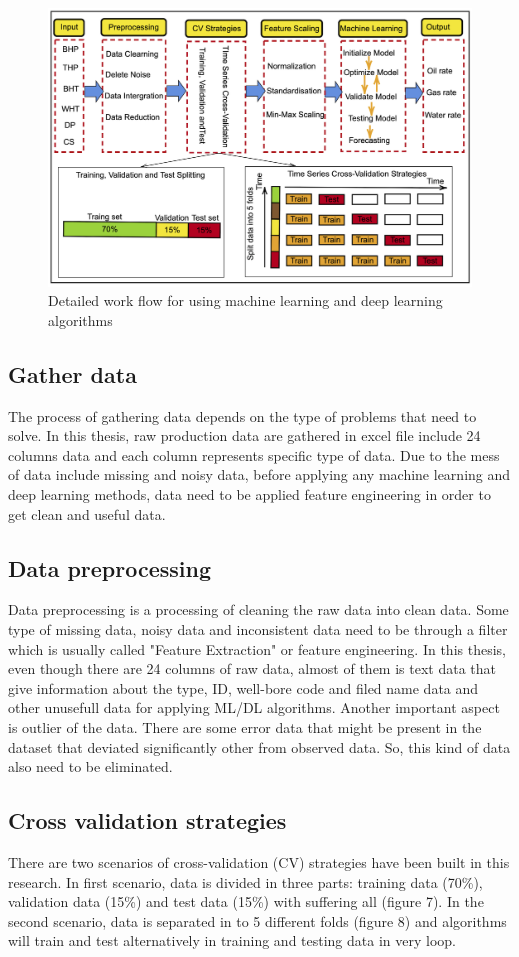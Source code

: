 \documentclass[12pt,a4paper]{report}
\begin{document}
\begin{figure}[H]
\centering
\includegraphics[scale=0.55]{Fig/4.png}
\caption{Detailed work flow for using machine learning and deep learning algorithms}
\end{figure}
\subsection{Gather data}
The process of gathering data depends on the type of problems that need to solve. In this thesis, raw production data are gathered in excel file include 24 columns data and each column represents specific type of data. Due to the mess of data include missing and noisy data, before applying any machine learning and deep learning methods, data need to be applied feature engineering in order to get clean and useful data.

\subsection{Data preprocessing}
Data preprocessing is a processing of cleaning the raw data into clean data. Some type of missing data, noisy data and inconsistent data need to be through a filter which is usually called "Feature Extraction" or feature engineering. In this thesis, even though there are 24 columns of raw data, almost of them is text data that give information about the type, ID, well-bore code and filed name data and other unusefull data for applying ML/DL algorithms. Another important aspect is outlier of the data. There are some error data that might be present in the dataset that deviated significantly other from observed data. So, this kind of data also need to be eliminated.
\subsection{Cross validation strategies}
There are two scenarios of cross-validation (CV) strategies have been built in this research. In first scenario, data is divided in three parts: training data (70\%), validation data (15\%) and test data (15\%) with suffering all (figure 7). In the second scenario, data is separated in to 5 different folds (figure 8) and algorithms will train and test alternatively in training and testing data in very loop.
\end{document}

